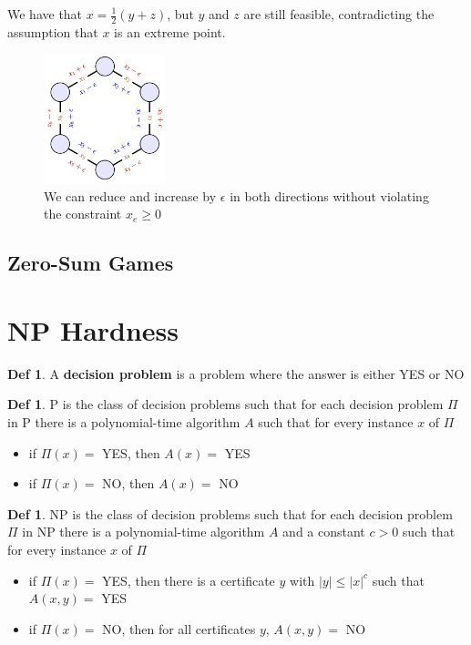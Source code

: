 \documentclass{article}
\theoremstyle{plain}
\theoremstyle{definition}
\newtheorem{defn}[dummy]{Def}
\begin{document}
            We have that $x = \frac{1}{2}(y + z)$, but $y$ and $z$ are still feasible, contradicting the assumption that $x$ is an extreme point. 
        \begin{figure}[H]
            \centering
            \includegraphics[width=100pt]{images/epsiloncycle.png}
            \caption{We can reduce and increase by $\epsilon$ in both directions without violating the constraint $x_e \geq 0$}
            \label{fig:epsiloncycle}
        \end{figure}
    \subsection{Zero-Sum Games}
\section{NP Hardness}

    \begin{defn}
        A \textbf{decision problem} is a problem where the answer is either YES or NO
    \end{defn}

    \begin{defn}
        P is the class of decision problems such that for each decision problem $\Pi$ in P there is a polynomial-time algorithm $A$ such that for every instance $x$ of $\Pi$
        \begin{itemize}
            \item if $\Pi(x) = $ YES, then $A(x) =$ YES
            \item if $\Pi(x) = $ NO, then $A(x) = $ NO
        \end{itemize}
    \end{defn}

    \begin{defn}
        NP is the class of decision problems such that for each decision problem $\Pi$ in NP there is a polynomial-time algorithm $A$ and a constant $c > 0$ such that for every instance $x$ of $\Pi$
        \begin{itemize}
            \item if $\Pi(x) = $ YES, then there is a certificate $y$ with $|y| \leq |x|^c$ such that $A(x,y) = $ YES
            \item if $\Pi(x) = $ NO, then for all certificates $y$, $A(x,y) = $ NO
        \end{itemize}
    \end{defn}
\end{document}
